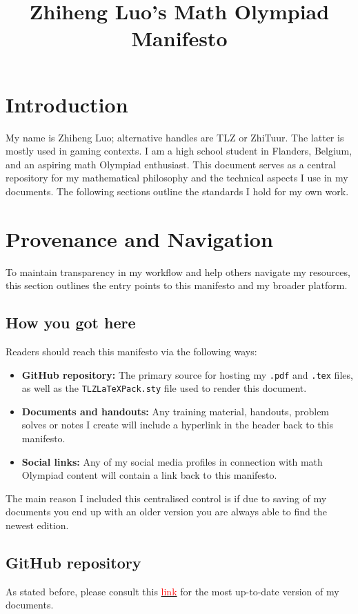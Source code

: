 \documentclass{article}
\title{Zhiheng Luo's Math Olympiad Manifesto}
\author{\TLZFullAuthor}
\begin{document}
\maketitle

\newpage
\section{Introduction}
My name is Zhiheng Luo; alternative handles are TLZ or ZhiTuur. The latter is mostly used in gaming contexts.
I am a high school student in Flanders, Belgium, and an aspiring math Olympiad enthusiast.
This document serves as a central repository for my mathematical philosophy and the technical aspects I use in my documents.
The following sections outline the standards I hold for my own work.

\section{Provenance and Navigation}

To maintain transparency in my workflow and help others navigate my resources, this section outlines the entry points to this manifesto and my broader platform.

\subsection{How you got here}
Readers should reach this manifesto via the following ways:
\begin{itemize}
    \item \textbf{GitHub repository:} The primary source for hosting my \texttt{.pdf} and \texttt{.tex} files, as well as the \texttt{TLZLaTeXPack.sty} file used to render this document.
    \item \textbf{Documents and handouts:} Any training material, handouts, problem solves or notes I create will include a hyperlink in the header back to this manifesto.
    \item \textbf{Social links:} Any of my social media profiles in connection with math Olympiad content will contain a link back to this manifesto.
\end{itemize}
The main reason I included this centralised control is if due to saving of my documents you end up with an older version you are always able to find the newest edition.

\subsection{GitHub repository}
As stated before, please consult this \href{https://github.com/Zhituur}{\textcolor{red}{link}} for the most up-to-date version of my documents.
\end{document}
